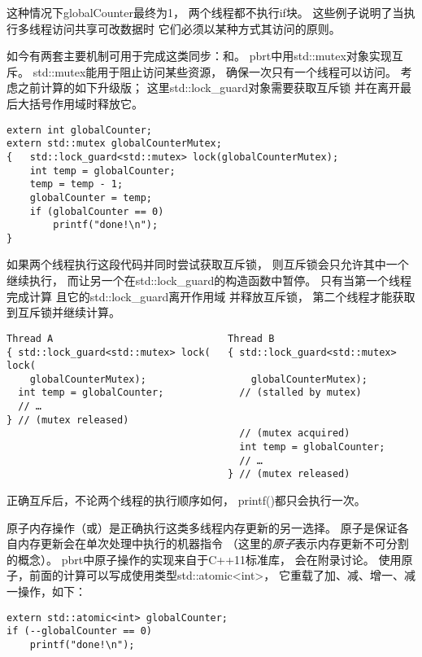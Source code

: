 这种情况下{\ttfamily globalCounter}最终为1，
两个线程都不执行{\ttfamily if}块。
这些例子说明了当执行多线程访问共享可改数据时
它们必须以某种方式其访问的原则。

如今有两套主要机制可用于完成这类同步：和。
pbrt中用{\ttfamily std::mutex}对象实现互斥。
{\ttfamily std::mutex}能用于阻止访问某些资源，
确保一次只有一个线程可以访问。
考虑之前计算的如下升级版；
这里{\ttfamily std::lock\_guard}对象需要获取互斥锁
并在离开最后大括号作用域时释放它。
\begin{lstlisting}
extern int globalCounter;
extern std::mutex globalCounterMutex;
{   std::lock_guard<std::mutex> lock(globalCounterMutex);
    int temp = globalCounter;
    temp = temp - 1;
    globalCounter = temp;
    if (globalCounter == 0)
        printf("done!\n");
}
\end{lstlisting}
如果两个线程执行这段代码并同时尝试获取互斥锁，
则互斥锁会只允许其中一个继续执行，
而让另一个在{\ttfamily std::lock\_guard}的构造函数中暂停。
只有当第一个线程完成计算
且它的{\ttfamily std::lock\_guard}离开作用域
并释放互斥锁，
第二个线程才能获取到互斥锁并继续计算。
\begin{lstlisting}
Thread A                              Thread B
{ std::lock_guard<std::mutex> lock(   { std::lock_guard<std::mutex> lock(
    globalCounterMutex);                  globalCounterMutex);
  int temp = globalCounter;             // (stalled by mutex)
  // …
} // (mutex released)
                                        // (mutex acquired)
                                        int temp = globalCounter;
                                        // …
                                      } // (mutex released)
\end{lstlisting}

正确互斥后，不论两个线程的执行顺序如何，
{\ttfamily printf()}都只会执行一次。

原子内存操作（或）是正确执行这类多线程内存更新的另一选择。
原子是保证各自内存更新会在单次处理中执行的机器指令
（这里的\emph{原子}表示内存更新不可分割的概念）。
pbrt中原子操作的实现来自于C++11标准库，
会在附录讨论。
使用原子，前面的计算可以写成使用类型{\ttfamily std::atomic<int>}，
它重载了加、减、增一、减一操作，如下：
\begin{lstlisting}
extern std::atomic<int> globalCounter;
if (--globalCounter == 0)
    printf("done!\n");
\end{lstlisting}

